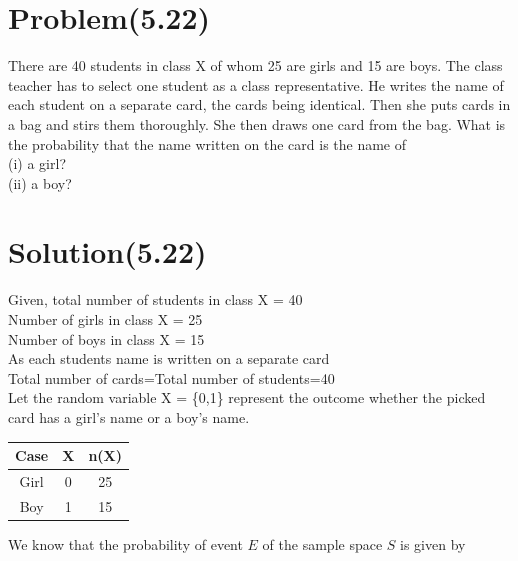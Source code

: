 \documentclass[journal,12pt,twocolumn]{IEEEtran}
\begin{document}
\section*{Problem(5.22)}
    There are 40 students in class X of whom 25 are girls and 15 are boys. The class teacher has to select one student as a class representative.
    He writes the name of each student on a separate card, the cards being identical. Then she puts cards in a bag and stirs them thoroughly. She then draws one card from the bag. What is the probability that the name written on the card is the name of\\
    (i) a girl?\\
    (ii) a boy?
\section*{Solution(5.22)}
Given, total number of students in class X = 40\\
Number of girls in class X = 25\\
Number of boys in class X = 15\\
As each students name is written on a separate card\\
Total number of cards=Total number of students=40\\
Let the random variable X = \{0,1\} represent the outcome whether the picked card has a girl's name or a boy's name.\\

\begin{table}[h]
    \centering
    \begin{tabular}{|c|c|c|}
         \hline
        \textbf{Case}&\textbf{X}&\textbf{n(X)} \\
        \hline    
         Girl&0&25\\
         \hline
         Boy&1&15\\
         \hline
    \end{tabular}
\end{table}
We know that the probability of event $E$ of the sample space $S$ is given by
\end{document}
